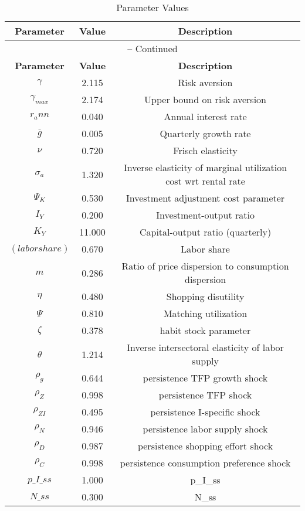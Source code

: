 \begin{center}
\begin{longtable}{ccc}
\caption{Parameter Values}\\%
\toprule%
\multicolumn{1}{c}{\textbf{Parameter}} &
\multicolumn{1}{c}{\textbf{Value}} &
 \multicolumn{1}{c}{\textbf{Description}}\\%
\midrule%
\endfirsthead
\multicolumn{3}{c}{{\tablename} \thetable{} -- Continued}\\%
\midrule%
\multicolumn{1}{c}{\textbf{Parameter}} &
\multicolumn{1}{c}{\textbf{Value}} &
  \multicolumn{1}{c}{\textbf{Description}}\\%
\midrule%
\endhead
${\gamma}$ 	 & 	 2.115 	 & 	 Risk aversion\\
${\gamma_{max}}$ 	 & 	 2.174 	 & 	 Upper bound on risk aversion\\
${r_ann}$ 	 & 	 0.040 	 & 	 Annual interest rate\\
${\overline{g}}$ 	 & 	 0.005 	 & 	 Quarterly growth rate\\
$\nu$ 	 & 	 0.720 	 & 	 Frisch elasticity\\
${\sigma_a}$ 	 & 	 1.320 	 & 	 Inverse elasticity of marginal utilization cost wrt rental rate\\
${\Psi_K}$ 	 & 	 0.530 	 & 	 Investment adjustment cost parameter\\
${I_Y}$ 	 & 	 0.200 	 & 	 Investment-output ratio\\
${K_Y}$ 	 & 	 11.000 	 & 	 Capital-output ratio (quarterly)\\
$(labor share)$ 	 & 	 0.670 	 & 	 Labor share\\
${m}$ 	 & 	 0.286 	 & 	 Ratio of price dispersion to consumption dispersion\\
${\eta}$ 	 & 	 0.480 	 & 	 Shopping disutility\\
${\Psi}$ 	 & 	 0.810 	 & 	 Matching utilization\\
${\zeta}$ 	 & 	 0.378 	 & 	 habit stock parameter\\
${\theta}$ 	 & 	 1.214 	 & 	 Inverse intersectoral elasticity of labor supply\\
${\rho_g}$ 	 & 	 0.644 	 & 	 persistence TFP growth shock\\
${\rho_Z}$ 	 & 	 0.998 	 & 	 persistence TFP shock\\
${\rho_{ZI}}$ 	 & 	 0.495 	 & 	 persistence I-specific shock\\
${\rho_N}$ 	 & 	 0.946 	 & 	 persistence labor supply shock\\
${\rho_D}$ 	 & 	 0.987 	 & 	 persistence shopping effort shock\\
${\rho_C}$ 	 & 	 0.998 	 & 	 persistence consumption preference shock\\
$p\_I\_ss$ 	 & 	 1.000 	 & 	 p\_I\_ss\\
$N\_ss$ 	 & 	 0.300 	 & 	 N\_ss\\
\bottomrule%
\end{longtable}
\end{center}
